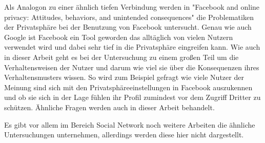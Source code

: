 Als Analogon zu einer ähnlich tiefen Verbindung werden in "Facebook and online privacy: Attitudes, behaviors, and unintended consequences" \cite{debatin2009facebook} die Problematiken der Privatsphäre bei der Benutzung von Facebook untersucht. Genau wie auch Google ist Facebook ein Tool geworden das alltäglich von vielen Nutzern verwendet wird und dabei sehr tief in die Privatsphäre eingreifen kann. Wie auch in dieser Arbeit geht es bei der Untersuchung zu einem großen Teil um die Verhaltensweisen der Nutzer und darum wie viel sie über die Konsequenzen ihres Verhaltensmusters wissen. So wird zum Beispiel gefragt wie viele Nutzer der Meinung sind sich mit den Privatsphäreeinstellungen in Facebook auszukennen und ob sie sich in der Lage fühlen ihr Profil zumindest vor dem Zugriff Dritter zu schützen. Ähnliche Fragen werden auch in dieser Arbeit behandelt.

Es gibt vor allem im Bereich Social Network noch weitere Arbeiten die ähnliche Untersuchungen unternehmen, allerdings werden diese hier nicht dargestellt.